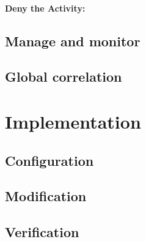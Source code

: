 \paragraph{Deny the Activity:} 

\subsection{Manage and monitor}

\subsection{Global correlation}

\section{Implementation}

\subsection{Configuration}

\subsection{Modification}

\subsection{Verification}